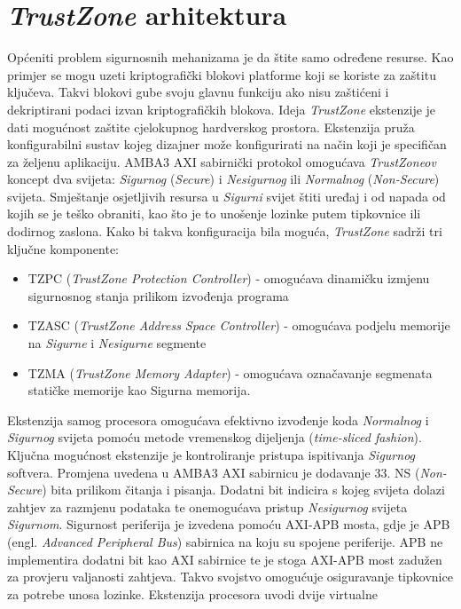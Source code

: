 \documentclass[times, utf8, diplomski, numeric]{fer}
\begin{document}
\section{\textit{TrustZone} arhitektura}
Općeniti problem sigurnosnih mehanizama je da štite samo određene resurse. Kao primjer se mogu uzeti kriptografički blokovi
platforme koji se koriste za zaštitu ključeva. Takvi blokovi gube svoju glavnu funkciju ako nisu zaštićeni i dekriptirani
podaci izvan kriptografičkih blokova. Ideja \textit{TrustZone} ekstenzije je dati mogućnost zaštite cjelokupnog hardverskog
prostora. Ekstenzija pruža konfigurabilni sustav kojeg dizajner može konfigurirati na način koji je specifičan za željenu
aplikaciju. AMBA3 AXI sabirnički protokol omogućava \textit{TrustZoneov} koncept dva svijeta: \textit{Sigurnog} (\textit{Secure}) i
\textit{Nesigurnog} ili \textit{Normalnog} (\textit{Non-Secure}) svijeta. Smještanje osjetljivih resursa u \textit{Sigurni} svijet štiti uređaj i od napada
od kojih se je teško obraniti, kao što je to unošenje lozinke putem tipkovnice ili dodirnog zaslona.
Kako bi takva konfiguracija bila moguća, \textit{TrustZone} sadrži tri ključne komponente:
\begin{itemize}
  \item{TZPC (\textit{TrustZone Protection Controller}) - omogućava dinamičku izmjenu sigurnosnog stanja prilikom izvođenja
  programa}
  \item{TZASC (\textit{TrustZone Address Space Controller}) - omogućava podjelu memorije na \textit{Sigurne} i \textit{Nesigurne} segmente}
  \item{TZMA (\textit{TrustZone Memory Adapter}) - omogućava označavanje segmenata statičke memorije kao Sigurna memorija.}
\end{itemize}
Ekstenzija samog procesora
omogućava efektivno izvođenje koda \textit{Normalnog} i \textit{Sigurnog} svijeta pomoću metode vremenskog dijeljenja (\textit{time-sliced
fashion}). Ključna mogućnost ekstenzije je kontroliranje pristupa ispitivanja \textit{Sigurnog} softvera. Promjena uvedena u AMBA3
AXI sabirnicu je dodavanje 33. NS (\textit{Non-Secure}) bita prilikom čitanja i pisanja. Dodatni bit indicira s kojeg
svijeta dolazi zahtjev za razmjenu podataka te onemogućava pristup \textit{Nesigurnog} svijeta \textit{Sigurnom}. Sigurnost periferija je
izvedena pomoću AXI-APB mosta, gdje je APB (engl. \textit{Advanced Peripheral Bus}) sabirnica na koju su spojene
periferije. APB ne implementira dodatni bit kao AXI sabirnice te je stoga AXI-APB most zadužen za provjeru valjanosti
zahtjeva. Takvo svojstvo omogućuje osiguravanje tipkovnice za potrebe unosa lozinke. Ekstenzija procesora uvodi dvije virtualne
\end{document}
